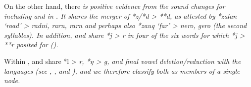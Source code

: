 On the other hand,
there \it{is} positive evidence from the sound changes for including
 and  in .
It shares the merger of *z/*d > **d,
as attested by *zalan ‘road’ >   \it{radni},
  \it{rarn},  \it{rarn}
and perhaps also *zauq ‘far’ >  \it{nero},
 \it{gero} (the second syllables).
In addition,  and  share *j > \it{r} in four of the
six words for which *j > **r posited for  ().

Within ,  and  share *l > \it{r},
*ŋ > \it{g}, and final vowel deletion/reduction with the  languages (see ,
, and ), and we therefore classify both
as members of a single  node.